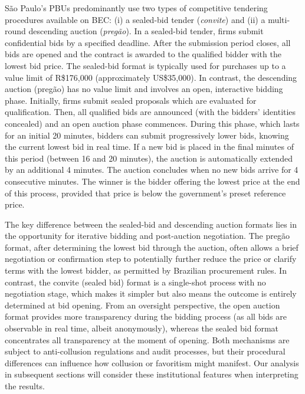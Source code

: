 São Paulo's PBUs predominantly use two types of competitive tendering procedures available on BEC: (i) a sealed-bid tender (\emph{convite}) and (ii) a multi-round descending auction (\emph{pregão}). In a sealed-bid tender, firms submit confidential bids by a specified deadline. After the submission period closes, all bids are opened and the contract is awarded to the qualified bidder with the lowest bid price. The sealed-bid format is typically used for purchases up to a value limit of R\$176,000 (approximately US\$35,000). In contrast, the descending auction (pregão) has no value limit and involves an open, interactive bidding phase. Initially, firms submit sealed proposals which are evaluated for qualification. Then, all qualified bids are announced (with the bidders' identities concealed) and an open auction phase commences. During this phase, which lasts for an initial 20 minutes, bidders can submit progressively lower bids, knowing the current lowest bid in real time. If a new bid is placed in the final minutes of this period (between 16 and 20 minutes), the auction is automatically extended by an additional 4 minutes. The auction concludes when no new bids arrive for 4 consecutive minutes. The winner is the bidder offering the lowest price at the end of this process, provided that price is below the government's preset reference price.

The key difference between the sealed-bid and descending auction formats lies in the opportunity for iterative bidding and post-auction negotiation. The pregão format, after determining the lowest bid through the auction, often allows a brief negotiation or confirmation step to potentially further reduce the price or clarify terms with the lowest bidder, as permitted by Brazilian procurement rules. In contrast, the convite (sealed bid) format is a single-shot process with no negotiation stage, which makes it simpler but also means the outcome is entirely determined at bid opening. From an oversight perspective, the open auction format provides more transparency during the bidding process (as all bids are observable in real time, albeit anonymously), whereas the sealed bid format concentrates all transparency at the moment of opening. Both mechanisms are subject to anti-collusion regulations and audit processes, but their procedural differences can influence how collusion or favoritism might manifest. Our analysis in subsequent sections will consider these institutional features when interpreting the results.
